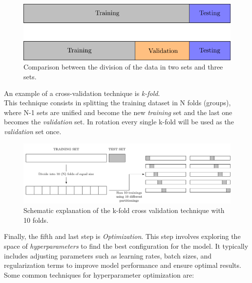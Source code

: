 \begin{figure}[h]
\centering
\includegraphics[scale=0.8]{Chapters/Chapter2/cross.pdf}
\caption{Comparison between the division of the data in two sets and three sets.}
\end{figure}

An example of a cross-validation technique is \textit{k-fold}.\\
This technique consists in splitting the training dataset in N folds (groups), where N-1 sets are unified and become the new \textit{training} set 
and the last one becomes the \textit{validation} set.
In rotation every single k-fold will be used as the \textit{validation} set once.\\

\begin{figure}[h]
\centering
\includegraphics[scale=0.7]{Chapters/Chapter2/kfold.pdf}
\caption{Schematic explanation of the k-fold cross validation technique with 10 folds.}
\end{figure}


Finally, the fifth and last step is \textit{Optimization}. This step involves exploring the space of \textit{hyperparameters} to find the best 
configuration for the model. It typically includes adjusting parameters such as learning rates, batch sizes, and regularization terms to improve 
model performance and ensure optimal results.\\
Some common techniques for hyperparameter optimization are:


